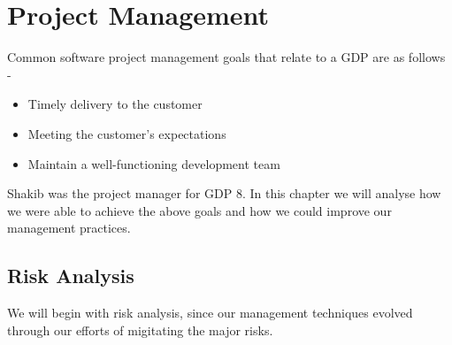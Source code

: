 \chapter{Project Management}
\label{chap:project-management}

Common software project management goals that relate to a GDP are as follows \cite{iansommerville2011} -

\begin{itemize}

  \item Timely delivery to the customer
  \item Meeting the customer's expectations
  \item Maintain a well-functioning development team

\end{itemize}

Shakib was the project manager for GDP 8. In this chapter we will analyse how we were able to achieve the above goals and how we could improve our management practices.

\section{Risk Analysis}
\label{sec:risk-analysis}

We will begin with risk analysis, since our management techniques evolved through our efforts of migitating the major risks.

